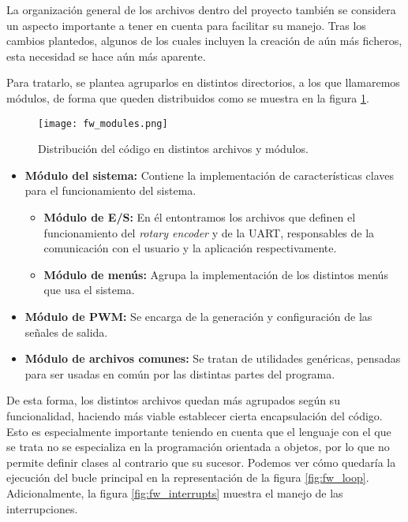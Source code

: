 La organización general de los archivos dentro del proyecto también se considera un aspecto importante a tener en cuenta para facilitar su manejo. Tras los cambios plantedos, algunos de los cuales incluyen la creación de aún más ficheros, esta necesidad se hace aún más aparente.

Para tratarlo, se plantea agruparlos en distintos directorios, a los que llamaremos módulos, de forma que queden distribuidos como se muestra en la figura \ref{fig:fw_modules}.

\begin{figure}[h!]
    \centering
	\texttt{[image: fw\_modules.png]}
	\caption{Distribución del código en distintos archivos y módulos.}
    \label{fig:fw_modules}
\end{figure}

\begin{itemize}
    \item\textbf{Módulo del sistema:} Contiene la implementación de características claves para el funcionamiento del sistema.
        \begin{itemize}
            \item\textbf{Módulo de E/S:} En él entontramos los archivos que definen el funcionamiento del \textit{rotary encoder} y de la UART, responsables de la comunicación con el usuario y la aplicación respectivamente.
            \item\textbf{Módulo de menús:} Agrupa la implementación de los distintos menús que usa el sistema.
        \end{itemize}
    \item\textbf{Módulo de PWM:} Se encarga de la generación y configuración de las señales de salida.
    \item\textbf{Módulo de archivos comunes:} Se tratan de utilidades genéricas, pensadas para ser usadas en común por las distintas partes del programa.
\end{itemize}

De esta forma, los distintos archivos quedan más agrupados según su funcionalidad, haciendo más viable establecer cierta encapsulación del código. Esto es especialmente importante teniendo en cuenta que el lenguaje con el que se trata no se especializa en la programación orientada a objetos, por lo que no permite definir clases al contrario que su sucesor. Podemos ver cómo quedaría la ejecución del bucle principal en la representación de la figura \ref{fig:fw_loop}. Adicionalmente, la figura \ref{fig:fw_interrupts} muestra el manejo de las interrupciones.

